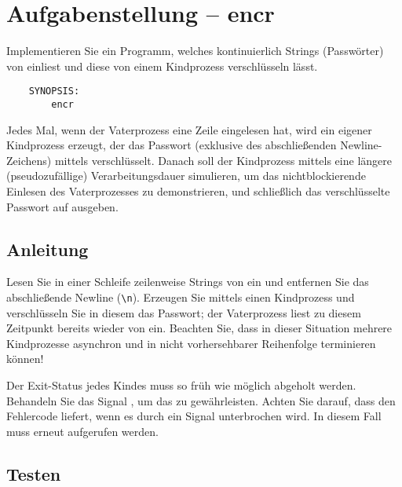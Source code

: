 




\section*{Aufgabenstellung -- encr}

Implementieren Sie ein Programm, welches kontinuierlich Strings
(Passwörter) von  einliest und diese von einem Kindprozess
verschlüsseln lässt.

\begin{verbatim}
    SYNOPSIS:
        encr
\end{verbatim}

Jedes Mal, wenn der Vaterprozess eine Zeile eingelesen hat, wird ein
eigener Kindprozess erzeugt, der das Passwort (exklusive des
abschließenden Newline-Zeichens) mittels 
verschlüsselt. Danach soll der Kindprozess mittels 
eine längere (pseudozufällige) Verarbeitungsdauer simulieren, um das
nichtblockierende Einlesen des Vaterprozesses zu demonstrieren, und
schließlich das verschlüsselte Passwort auf  ausgeben.

\subsection*{Anleitung}

Lesen Sie in einer Schleife zeilenweise Strings von  ein
und entfernen Sie das abschließende Newline (\verb+\n+). Erzeugen Sie
mittels  einen Kindprozess und verschlüsseln Sie in
diesem das Passwort; der Vaterprozess liest zu diesem Zeitpunkt
bereits wieder von  ein. Beachten Sie, dass in dieser
Situation mehrere Kindprozesse asynchron und in nicht vorhersehbarer
Reihenfolge terminieren können!

Der Exit-Status jedes Kindes muss so früh wie möglich abgeholt werden.
Behandeln Sie das Signal , um das zu gewährleisten.
Achten Sie darauf, dass  den Fehlercode 
liefert, wenn es durch ein Signal unterbrochen wird. In diesem Fall
muss  erneut aufgerufen werden.

\subsection*{Testen}

